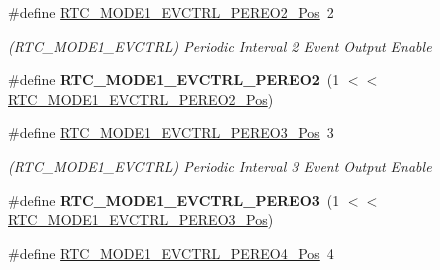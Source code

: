 \begin{DoxyCompactItemize}
\item 
\hypertarget{group___s_a_m_l21___r_t_c_gae7793a997074013d63e3e6557be034c2}{}\#define \hyperlink{group___s_a_m_l21___r_t_c_gae7793a997074013d63e3e6557be034c2}{R\+T\+C\+\_\+\+M\+O\+D\+E1\+\_\+\+E\+V\+C\+T\+R\+L\+\_\+\+P\+E\+R\+E\+O2\+\_\+\+Pos}~2\label{group___s_a_m_l21___r_t_c_gae7793a997074013d63e3e6557be034c2}

\begin{DoxyCompactList}\small\item\em (R\+T\+C\+\_\+\+M\+O\+D\+E1\+\_\+\+E\+V\+C\+T\+R\+L) Periodic Interval 2 Event Output Enable \end{DoxyCompactList}\item 
\hypertarget{group___s_a_m_l21___r_t_c_gaecc260e24b8ec18df7f892f78fe2b0e1}{}\#define {\bfseries R\+T\+C\+\_\+\+M\+O\+D\+E1\+\_\+\+E\+V\+C\+T\+R\+L\+\_\+\+P\+E\+R\+E\+O2}~(1 $<$$<$ \hyperlink{group___s_a_m_l21___r_t_c_gae7793a997074013d63e3e6557be034c2}{R\+T\+C\+\_\+\+M\+O\+D\+E1\+\_\+\+E\+V\+C\+T\+R\+L\+\_\+\+P\+E\+R\+E\+O2\+\_\+\+Pos})\label{group___s_a_m_l21___r_t_c_gaecc260e24b8ec18df7f892f78fe2b0e1}

\item 
\hypertarget{group___s_a_m_l21___r_t_c_ga659202b68a5488009b36a511fd3758e3}{}\#define \hyperlink{group___s_a_m_l21___r_t_c_ga659202b68a5488009b36a511fd3758e3}{R\+T\+C\+\_\+\+M\+O\+D\+E1\+\_\+\+E\+V\+C\+T\+R\+L\+\_\+\+P\+E\+R\+E\+O3\+\_\+\+Pos}~3\label{group___s_a_m_l21___r_t_c_ga659202b68a5488009b36a511fd3758e3}

\begin{DoxyCompactList}\small\item\em (R\+T\+C\+\_\+\+M\+O\+D\+E1\+\_\+\+E\+V\+C\+T\+R\+L) Periodic Interval 3 Event Output Enable \end{DoxyCompactList}\item 
\hypertarget{group___s_a_m_l21___r_t_c_ga42108d2f3b22d4571b7a1e66b9098e1c}{}\#define {\bfseries R\+T\+C\+\_\+\+M\+O\+D\+E1\+\_\+\+E\+V\+C\+T\+R\+L\+\_\+\+P\+E\+R\+E\+O3}~(1 $<$$<$ \hyperlink{group___s_a_m_l21___r_t_c_ga659202b68a5488009b36a511fd3758e3}{R\+T\+C\+\_\+\+M\+O\+D\+E1\+\_\+\+E\+V\+C\+T\+R\+L\+\_\+\+P\+E\+R\+E\+O3\+\_\+\+Pos})\label{group___s_a_m_l21___r_t_c_ga42108d2f3b22d4571b7a1e66b9098e1c}

\item 
\hypertarget{group___s_a_m_l21___r_t_c_gab38f490e7a1f446ef89cf863a8a476b7}{}\#define \hyperlink{group___s_a_m_l21___r_t_c_gab38f490e7a1f446ef89cf863a8a476b7}{R\+T\+C\+\_\+\+M\+O\+D\+E1\+\_\+\+E\+V\+C\+T\+R\+L\+\_\+\+P\+E\+R\+E\+O4\+\_\+\+Pos}~4\label{group___s_a_m_l21___r_t_c_gab38f490e7a1f446ef89cf863a8a476b7}


\end{DoxyCompactItemize}
